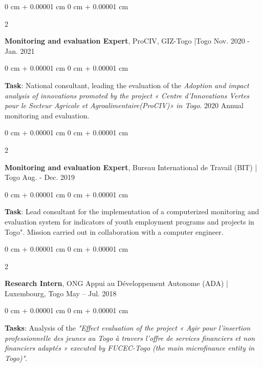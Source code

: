 \documentclass[10 pt, letterpaper]{article}
\newenvironment{onecolentry}{
    \begin{adjustwidth}{
        0 cm + 0.00001 cm
    }{
        0 cm + 0.00001 cm
    }
}{
    \end{adjustwidth}
} %
\newenvironment{twocolentry}[2][]{
    \onecolentry
    \def\secondColumn{#2}
    \setcolumnwidth{\fill, 4.5 cm}
    \begin{paracol}{2}
}{
    \switchcolumn \raggedleft \secondColumn
    \end{paracol}
    \endonecolentry
} %
\begin{document}
        \vspace{0.20 cm}

        \begin{twocolentry}{
            Nov. 2020 - Jan. 2021
        }
            \textbf{Monitoring and evaluation Expert}, ProCIV, GIZ-Togo |Togo \end{twocolentry}

        \vspace{0.10 cm}
        \begin{onecolentry}
            \textbf{Task}: National consultant, leading the evaluation of the \textit{Adoption and impact analysis of innovations promoted by the project « Centre d’Innovations Vertes pour le Secteur Agricole et Agroalimentaire(ProCIV)» in Togo}. 2020 Annual monitoring and evaluation.
        \end{onecolentry}

        \vspace{0.20 cm}

        \begin{twocolentry}{
            Aug. - Dec. 2019
        }
            \textbf{Monitoring and evaluation Expert}, Bureau International de Travail (BIT) | Togo \end{twocolentry}

        \vspace{0.10 cm}
        \begin{onecolentry}
            \textbf{Task}: Lead consultant for the implementation of a computerized monitoring and evaluation system for indicators of youth employment programs and projects in Togo". Mission carried out in collaboration with a computer engineer.
        \end{onecolentry}

        \vspace{0.20 cm}

        \begin{twocolentry}{
            May – Jul. 2018
        }
            \textbf{Research Intern}, ONG Appui au Développement Autonome (ADA) | Luxembourg, Togo \end{twocolentry}

        \vspace{0.10 cm}
        \begin{onecolentry}
            \textbf{Tasks}: Analysis of the \textit{"Effect evaluation of the project « Agir pour l’insertion professionnelle des jeunes au Togo à travers l’offre de services financiers et non financiers adaptés » executed by FUCEC-Togo (the main microfinance entity in Togo)"}.
        \end{onecolentry}
\end{document}
